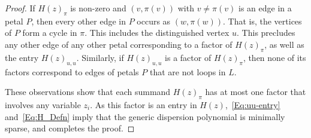 \documentclass[10pt,a4paper]{amsart}
\begin{document}
\begin{proof}
  If  $H(z)_\pi$ is non-zero and $(v,\pi(v))$ with $v\neq \pi(v)$ is an edge in a petal $P$, then every other edge in
  $P$ occurs as $(w,\pi(w))$.
  That is, the vertices of $P$ form a cycle in $\pi$.
  This includes the distinguished vertex $u$.
  This precludes any other edge of any other petal corresponding to a factor of $H(z)_\pi$, as well as the entry $H(z)_{u,u}$.
  Similarly, if $H(z)_{u,u}$ is a factor of $H(z)_\pi$, then none of its factors correspond to edges of
  petals $P$ that are not loops in $L$. 

  These observations show that  each summand $H(z)_\pi$ has at most one factor that
  involves any variable $z_i$.
  As this factor is an entry in $H(z)$,~\eqref{Eq:uu-entry} and~\eqref{Eq:H_Defn} imply that the generic dispersion polynomial
  is minimally sparse, and completes the proof.
\end{proof}
\end{document}
